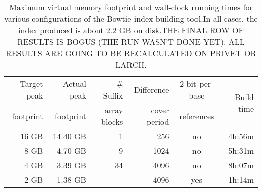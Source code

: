 \documentclass[letterpaper]{article}
\begin{document}
\begin{table}[tp]
\scriptsize
\begin{tabular}{rrrrcr}\toprule
Target peak & Actual peak & \# Suffix   & Difference   & 2-bit-per-base & \multirow{2}{*}{Build time} \\
footprint   & footprint   & array blocks & cover period & references     & \\ 
\toprule
16 GB & 14.40 GB & 1
 & 256
 & no & 4h:56m \\\midrule
8 GB & 4.70 GB & 9
 & 1024
 & no & 5h:31m \\\midrule
4 GB & 3.39 GB & 34
 & 4096
 & no & 8h:07m \\\midrule
2 GB & 1.38 GB &  & 4096
 & yes & 1h:14m \\
\bottomrule
\end{tabular}
\caption{Maximum virtual memory footprint and wall-clock running times for various configurations of the Bowtie index-building tool.In all cases, the index produced is about 2.2 GB on disk.THE FINAL ROW OF RESULTS IS BOGUS (THE RUN WASN'T DONE YET).  ALL RESULTS ARE GOING TO BE RECALCULATED ON PRIVET OR LARCH.}
\end{table}
\end{document}
